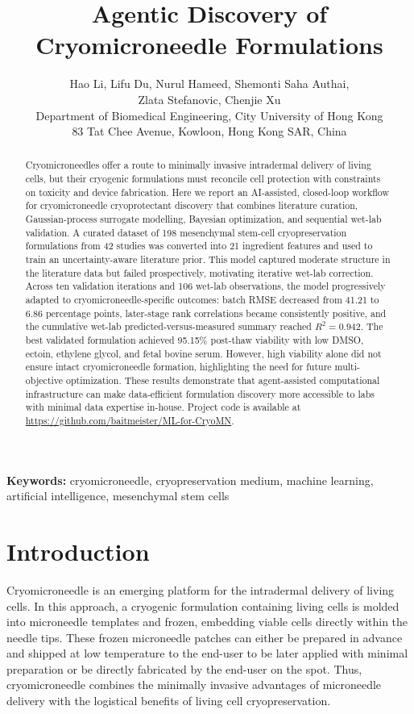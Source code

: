 \documentclass[11pt]{article}
\title{Agentic Discovery of Cryomicroneedle Formulations}
\author{Hao Li, Lifu Du, Nurul Hameed, Shemonti Saha Authai,\\Zlata Stefanovic, Chenjie Xu\\[0.35em]\small Department of Biomedical Engineering, City University of Hong Kong\\\small 83 Tat Chee Avenue, Kowloon, Hong Kong SAR, China}
\date{}
\begin{document}
\maketitle

\begin{abstract}
Cryomicroneedles offer a route to minimally invasive intradermal delivery of living cells, but their cryogenic formulations must reconcile cell protection with constraints on toxicity and device fabrication. Here we report an AI-assisted, closed-loop workflow for cryomicroneedle cryoprotectant discovery that combines literature curation, Gaussian-process surrogate modelling, Bayesian optimization, and sequential wet-lab validation. A curated dataset of 198 mesenchymal stem-cell cryopreservation formulations from 42 studies was converted into 21 ingredient features and used to train an uncertainty-aware literature prior. This model captured moderate structure in the literature data but failed prospectively, motivating iterative wet-lab correction. Across ten validation iterations and 106 wet-lab observations, the model progressively adapted to cryomicroneedle-specific outcomes: batch RMSE decreased from 41.21 to 6.86 percentage points, later-stage rank correlations became consistently positive, and the cumulative wet-lab predicted-versus-measured summary reached $R^2 = 0.942$. The best validated formulation achieved 95.15\% post-thaw viability with low DMSO, ectoin, ethylene glycol, and fetal bovine serum. However, high viability alone did not ensure intact cryomicroneedle formation, highlighting the need for future multi-objective optimization. These results demonstrate that agent-assisted computational infrastructure can make data-efficient formulation discovery more accessible to labs with minimal data expertise in-house. Project code is available at \url{https://github.com/baitmeister/ML-for-CryoMN}.
\end{abstract}

\noindent \textbf{Keywords:} cryomicroneedle, cryopreservation medium, machine learning, artificial intelligence, mesenchymal stem cells


\section{Introduction}

Cryomicroneedle is an emerging platform for the intradermal delivery of living cells. In this approach, a cryogenic formulation containing living cells is molded into microneedle templates and frozen, embedding viable cells directly within the needle tips. These frozen microneedle patches can either be prepared in advance and shipped at low temperature to the end-user to be later applied with minimal preparation or be directly fabricated by the end-user on the spot. Thus, cryomicroneedle combines the minimally invasive advantages of microneedle delivery with the logistical benefits of living cell cryopreservation.\cite{chang_cryomicroneedles_2021,zheng_insitu_cryomicroneedles_2024,bhatnagar_microneedles_2017}
\end{document}
